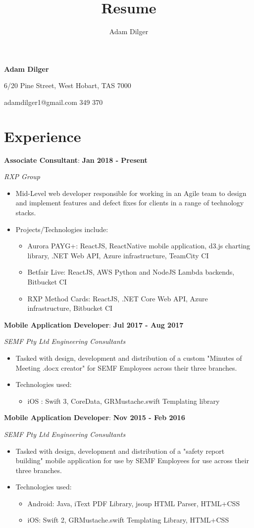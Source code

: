 \documentclass{article}
\author{Adam Dilger}
\title{Resume}
\makeatletter
\newcommand{\worktitle}[4]{
  \setlength{\parindent}{0pt}
  \small
  \textbf{#3}:
  \hfill
  \textbf{#1 - #2}

  \textit{#4}
}
\renewcommand{\maketitle}{
  \begin{center}
  \huge\textbf{Adam Dilger}
  \vspace{1mm}


  \normalsize
  6/20 Pine Street, West Hobart, TAS 7000

  adamdilger1@gmail.com
  \textbar
  \space
  0487 349 370
  \end{center}
}
\makeatother
\begin{document}
\maketitle

\section{Experience}

\worktitle
{Jan 2018}{Present}
{Associate Consultant}
{RXP Group}
\begin{itemize}
  \item Mid-Level web developer responsible for working in an Agile team to design and implement features and defect fixes for clients in a range of technology stacks.
  \item Projects/Technologies include:
  \begin{itemize}
    \item Aurora PAYG+: ReactJS, ReactNative mobile application, d3.js charting library, .NET Web API, Azure infrastructure, TeamCity CI
    \item Betfair Live: ReactJS, AWS Python and NodeJS Lambda backends, Bitbucket CI
    \item RXP Method Cards: ReactJS, .NET Core Web API, Azure infrastructure, Bitbucket CI
  \end{itemize}
\end{itemize}

\vspace{4mm}

\worktitle
{Jul 2017}{Aug 2017}
{Mobile Application Developer}
{SEMF Pty Ltd Engineering Consultants}
\begin{itemize}
  \item Tasked with design, development and distribution of a custom "Minutes of Meeting .docx creator" for SEMF Employees across their three branches.
  \item Technologies used:
  \begin{itemize}
    \item iOS : Swift 3, CoreData, GRMustache.swift Templating library
  \end{itemize}
\end{itemize}

\vspace{4mm}

\worktitle
{Nov 2015}{Feb 2016}
{Mobile Application Developer}
{SEMF Pty Ltd Engineering Consultants}
\begin{itemize}
  \item Tasked with design, development and distribution of a "safety report building" mobile application for use by SEMF Employees for use across their three branches.

  \item Technologies used:
  \begin{itemize}
    \item Android: Java, iText PDF Library, jsoup HTML Parser, HTML+CSS
    \item iOS: Swift 2, GRMustache.swift Templating Library, HTML+CSS
  \end{itemize}
\end{itemize}
\end{document}
